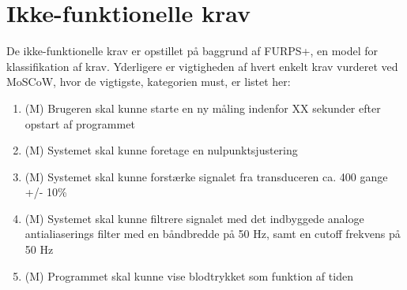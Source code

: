 \section{Ikke-funktionelle krav}
De ikke-funktionelle krav er opstillet på baggrund af FURPS+, en model for klassifikation af krav. Yderligere er vigtigheden af hvert enkelt krav vurderet ved MoSCoW, hvor de vigtigste, kategorien must, er listet her:

\begin{enumerate}
	\item (M) Brugeren skal kunne starte en ny måling indenfor XX sekunder efter opstart af programmet 
	\item (M) Systemet skal kunne foretage en nulpunktsjustering
	\item (M) Systemet skal kunne forstærke signalet fra transduceren ca. 400 gange +/- 10\%
	\item (M) Systemet skal kunne filtrere signalet med det indbyggede analoge antialiaserings filter med en båndbredde på 50 Hz, samt en cutoff frekvens på 50 Hz
	\item (M) Programmet skal kunne vise blodtrykket som funktion af tiden
\end{enumerate}



